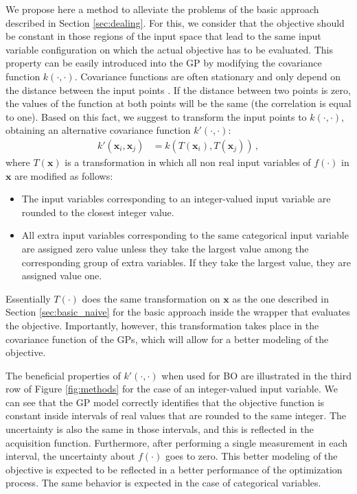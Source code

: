 We propose here a method to alleviate the problems of the basic approach described in Section \ref{sec:dealing}.
For this, we consider that the objective should be constant in those regions of the input space that
lead to the same input variable configuration on which the actual objective has to be evaluated.
This property can be easily introduced into the GP by modifying the covariance function
$k(\cdot,\cdot)$. Covariance functions are often stationary and only depend on the distance between the
input points \citep{rasmussen2003gaussian}. If the distance between two points is zero, the values of the function at
both points will be the same (the correlation is equal to one). Based on this fact, we suggest to transform
the input points to $k(\cdot,\cdot)$, obtaining an alternative covariance function $k'(\cdot,\cdot)$:
\begin{align}
k'(\mathbf{x}_i,\mathbf{x}_j) &= k(T(\mathbf{x}_i),T(\mathbf{x}_j)) \,,
\label{eq:covariance}
\end{align}
where $T(\mathbf{x})$ is a transformation in which all non real input variables of $f(\cdot)$ in $\mathbf{x}$
are modified as follows:
\begin{itemize}
\item The input variables corresponding to an integer-valued input variable are rounded to the closest integer value.
\item All extra input variables corresponding to the same categorical input variable are assigned zero value unless
        they take the largest value among the corresponding group of extra variables. If they take the largest value,
        they are assigned value one.
\end{itemize}
Essentially $T(\cdot)$ does the same transformation on $\mathbf{x}$ as the one described in Section
\ref{sec:basic_naive} for the basic approach inside the wrapper that evaluates the objective. Importantly, however,
this transformation takes place in the covariance function of the GPs, which will allow for a
better modeling of the objective.

The beneficial properties of $k'(\cdot,\cdot)$ when used for BO are illustrated in the
third row of Figure \ref{fig:methods} for the case of an integer-valued input variable.
We can see that the GP model correctly identifies that the objective function is constant
inside intervals of real values that are rounded to the same integer. The uncertainty is also
the same in those intervals, and this is reflected in the acquisition function. Furthermore, after performing
a single measurement in each interval, the uncertainty about $f(\cdot)$ goes to zero. This better modeling
of the objective is expected to be reflected in a better performance of the optimization process.
The same behavior is expected in the case of categorical variables.

